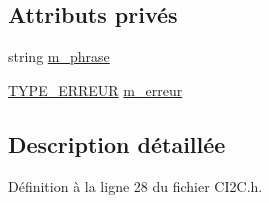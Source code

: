 \subsection*{Attributs privés}
\begin{DoxyCompactItemize}
\item 
string \hyperlink{class_c_i2_c_1_1_erreur_ac61872a33babfea899fa3f3feaedaf32}{m\+\_\+phrase}
\item 
\hyperlink{class_c_i2_c_1_1_erreur_a153281c8e751b72b355d52c548b511d5}{T\+Y\+P\+E\+\_\+\+E\+R\+R\+E\+U\+R} \hyperlink{class_c_i2_c_1_1_erreur_a0228754dfbaabca99985b8701fcd92b0}{m\+\_\+erreur}
\end{DoxyCompactItemize}


\subsection{Description détaillée}


Définition à la ligne 28 du fichier C\+I2\+C.\+h.



